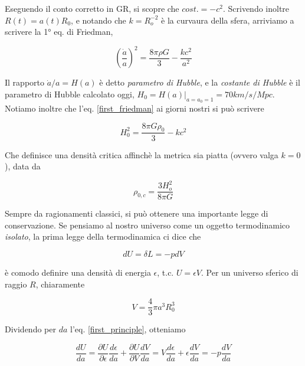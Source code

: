 \documentclass{report}
\begin{document}
Eseguendo il conto corretto in GR, si scopre che $cost. = -c^2$. Scrivendo inoltre $R(t) = a(t)R_0$, e notando che $k = R_o^{-2}$ è la curvaura della sfera, arriviamo a scrivere la 1° eq. di Friedman, 

\begin{tcolorbox}[colback=gray!15, colframe=black, boxrule=1pt]
\begin{equation}
    \label{first_friedman}
    \left(\frac{\dot{a}}{a} \right)^2 = \frac{8\pi \rho G}{3} - \frac{kc^2}{a^2} 
\end{equation}
\end{tcolorbox}

Il rapporto $\dot{a}/a = H(a)$ è detto \emph{parametro di Hubble}, e la \emph{costante di Hubble} è il parametro di Hubble calcolato oggi, $H_0 = H(a)|_{a = a_0 = 1} = 70 km/s/Mpc$. \\
Notiamo inoltre che l'eq. \ref{first_friedman} ai giorni nostri si può scrivere 

\begin{equation}
    H_0^2 = \frac{8\pi G\rho_0}{3} - kc^2
\end{equation}

Che definisce una densità critica affinchè la metrica sia piatta (ovvero valga $k=0$), data da

\begin{equation}
    \label{critical_density}
    \rho_{0, c} = \frac{3H_o^2}{8\pi G}
\end{equation}


Sempre da ragionamenti classici, si può ottenere una importante legge di conservazione. Se pensiamo al nostro universo come un oggetto termodinamico \emph{isolato}, la prima legge della termodinamica ci dice che 

\begin{equation}
    \label{first_principle}
    dU = \delta L = -pdV
\end{equation}

è comodo definire una densità di energia $\epsilon$, t.c. $U = \epsilon V$. Per un universo sferico di raggio $R$, chiaramente 

\begin{equation}
    \label{universe_volume}
    V = \frac{4}{3}\pi a^3 R_0^3
\end{equation}

Dividendo per $da$ l'eq. \ref{first_principle}, otteniamo

\begin{equation}
    \frac{dU}{da} = \frac{\partial U}{\partial \epsilon}\frac{d\epsilon}{da} + \frac{\partial U}{\partial V}\frac{dV}{da} = V\frac{d\epsilon}{da} + \epsilon\frac{dV}{da} = -p\frac{dV}{da} 
\end{equation}
\end{document}
